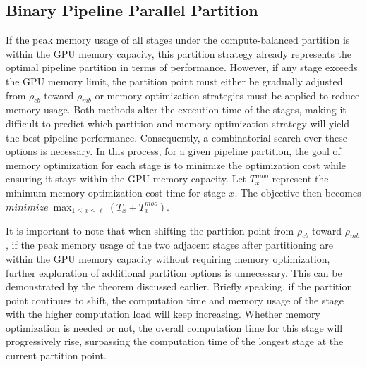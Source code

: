 \subsection{Binary Pipeline Parallel Partition}
If the peak memory usage of all stages under the compute-balanced partition is within the GPU memory capacity,
this partition strategy already represents the optimal pipeline partition in terms of performance.
However, if any stage exceeds the GPU memory limit,
the partition point must either be gradually adjusted from $\rho_{cb}$ toward $\rho_{mb}$
or memory optimization strategies must be applied to reduce memory usage.
Both methods alter the execution time of the stages,
making it difficult to predict which partition and memory optimization strategy will yield the best pipeline performance.
Consequently, a combinatorial search over these options is necessary.
In this process, for a given pipeline partition,
the goal of memory optimization for each stage is to minimize the optimization cost
while ensuring it stays within the GPU memory capacity.
Let $T_x^{moo}$ represent the minimum memory optimization cost time for stage $x$.
The objective then becomes $minimize\ \max_{1 \leq x \leq \ell} (T_x + T_x^{moo})$.

It is important to note that when shifting the partition point from $\rho_{cb}$ toward $\rho_{mb}$,
if the peak memory usage of the two adjacent stages after partitioning
are within the GPU memory capacity without requiring memory optimization,
further exploration of additional partition options is unnecessary.
This can be demonstrated by the theorem discussed earlier.
Briefly speaking, if the partition point continues to shift,
the computation time and memory usage of the stage with the higher computation load will keep increasing.
Whether memory optimization is needed or not,
the overall computation time for this stage will progressively rise,
surpassing the computation time of the longest stage at the current partition point.

